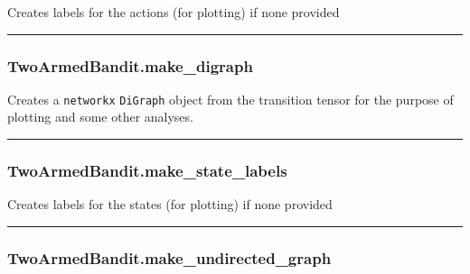 \begin{Shaded}
\begin{Highlighting}[]
\NormalTok{)}
\end{Highlighting}
\end{Shaded}

Creates labels for the actions (for plotting) if none provided

\begin{center}\rule{0.5\linewidth}{\linethickness}\end{center}

\subsubsection{TwoArmedBandit.make\_digraph}\label{twoarmedbandit.make_digraph}

\begin{Shaded}
\begin{Highlighting}[]
\NormalTok{)}
\end{Highlighting}
\end{Shaded}

Creates a \texttt{networkx} \texttt{DiGraph} object from the transition
tensor for the purpose of plotting and some other analyses.

\begin{center}\rule{0.5\linewidth}{\linethickness}\end{center}

\subsubsection{TwoArmedBandit.make\_state\_labels}\label{twoarmedbandit.make_state_labels}

\begin{Shaded}
\begin{Highlighting}[]
\NormalTok{)}
\end{Highlighting}
\end{Shaded}

Creates labels for the states (for plotting) if none provided

\begin{center}\rule{0.5\linewidth}{\linethickness}\end{center}

\subsubsection{TwoArmedBandit.make\_undirected\_graph}\label{twoarmedbandit.make_undirected_graph}

